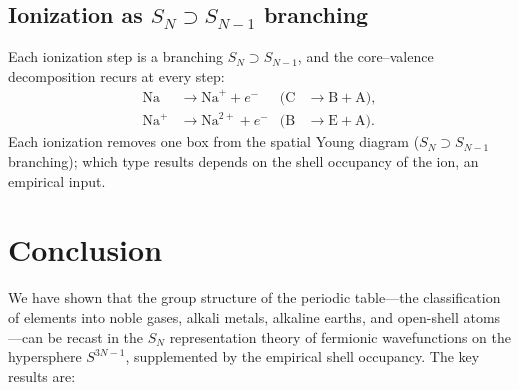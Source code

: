 \documentclass[aps,prl,twocolumn,superscriptaddress,longbibliography]{revtex4-2}
\begin{document}
\subsection{Ionization as $S_N \supset S_{N-1}$ branching}

Each ionization step is a branching $S_N \supset S_{N-1}$, and the
core--valence decomposition recurs at every step:
\begin{align*}
  \text{Na} &\to \text{Na}^+ + e^-
    & (\text{C} &\to \text{B} + \text{A}), \\
  \text{Na}^+ &\to \text{Na}^{2+} + e^-
    & (\text{B} &\to \text{E} + \text{A}).
\end{align*}
Each ionization removes one box from the spatial Young diagram
($S_N \supset S_{N-1}$ branching); which type results depends on the
shell occupancy of the ion, an empirical input.


\section{Conclusion}
\label{sec:conclusion}

We have shown that the group structure of the periodic table---the
classification of elements into noble gases, alkali metals, alkaline
earths, and open-shell atoms---can be recast in the $S_N$ representation
theory of fermionic wavefunctions on the hypersphere $S^{3N-1}$,
supplemented by the empirical shell occupancy.  The
key results are:
\end{document}
